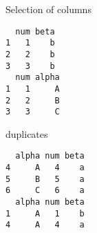 \documentclass[ignorenonframetext,]{beamer}
\newenvironment{Shaded}{\begin{snugshade}}{\end{snugshade}}
\newcommand{\DataTypeTok}[1]{\textcolor[rgb]{0.13,0.29,0.53}{#1}}
\newcommand{\DecValTok}[1]{\textcolor[rgb]{0.00,0.00,0.81}{#1}}
\newcommand{\KeywordTok}[1]{\textcolor[rgb]{0.13,0.29,0.53}{\textbf{#1}}}
\newcommand{\NormalTok}[1]{#1}
\newcommand{\OperatorTok}[1]{\textcolor[rgb]{0.81,0.36,0.00}{\textbf{#1}}}
\newcommand{\StringTok}[1]{\textcolor[rgb]{0.31,0.60,0.02}{#1}}
\begin{document}
\begin{frame}[fragile]{Selection of columns}
\protect\hypertarget{selection-of-columns}{}

\begin{Shaded}
\end{Shaded}

\begin{verbatim}
  num beta
1   1    b
2   2    b
3   3    b
  num alpha
1   1     A
2   2     B
3   3     C
\end{verbatim}

\end{frame}

\begin{frame}[fragile]{duplicates}
\protect\hypertarget{duplicates}{}

\begin{Shaded}
\end{Shaded}

\begin{verbatim}
  alpha num beta
4     A   4    a
5     B   5    a
6     C   6    a
  alpha num beta
1     A   1    b
4     A   4    a
\end{verbatim}

\end{frame}
\end{document}
